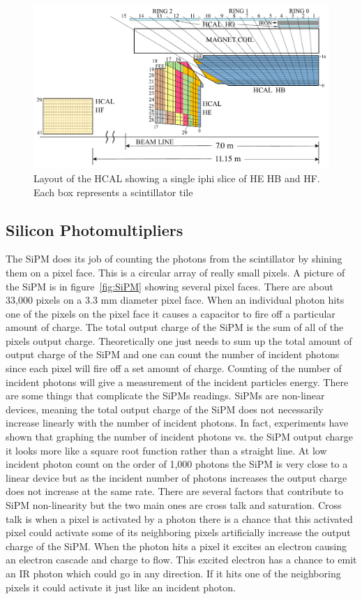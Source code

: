 \begin{figure}
\centering
\includegraphics[width=\linewidth]{Figures/Depthsegmentation.pdf}
\caption{Layout of the HCAL showing a single iphi slice of HE HB and HF. Each box represents a scintillator tile}
\label{fig:Depth}
\end{figure}


\subsection{Silicon Photomultipliers}
The SiPM does its job of counting the photons from the scintillator by shining them on a pixel face. This is a circular array of really small pixels. A picture of the SiPM is in figure~\ref{fig:SiPM} showing several pixel faces. There are about 33,000 pixels on a 3.3 mm diameter pixel face. When an individual photon hits one of the pixels on the pixel face it causes a capacitor to fire off a particular amount of charge. The total output charge of the SiPM is the sum of all of the pixels output charge. Theoretically one just needs to sum up the total amount of output charge of the SiPM and one can count the number of incident photons since each pixel will fire off a set amount of charge. Counting of the number of incident photons will give a measurement of the incident particles energy. There are some things that complicate the SiPMs readings. SiPMs are non-linear devices, meaning the total output charge of the SiPM does not necessarily increase linearly with the number of incident photons. In fact, experiments have shown that graphing the number of incident photons vs. the SiPM output charge it looks more like a square root function rather than a straight line. At low incident photon count on the order of 1,000 photons the SiPM is very close to a linear device but as the incident number of photons increases the output charge does not increase at the same rate. There are several factors that contribute to SiPM non-linearity but the two main ones are cross talk and saturation. Cross talk is when a pixel is activated by a photon there is a chance that this activated pixel could activate some of its neighboring pixels artificially increase the output charge of the SiPM. When the photon hits a pixel it excites an electron causing an electron cascade and charge to flow. This excited electron has a chance to emit an IR photon which could go in any direction. If it hits one of the neighboring pixels it could activate it just like an incident photon. 

